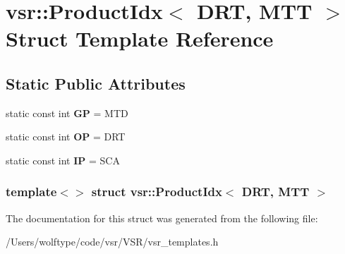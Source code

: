 \hypertarget{structvsr_1_1_product_idx_3_01_d_r_t_00_01_m_t_t_01_4}{\section{vsr\-:\-:Product\-Idx$<$ D\-R\-T, M\-T\-T $>$ Struct Template Reference}
\label{structvsr_1_1_product_idx_3_01_d_r_t_00_01_m_t_t_01_4}
}
\subsection*{Static Public Attributes}
\begin{DoxyCompactItemize}
\item 
\hypertarget{structvsr_1_1_product_idx_3_01_d_r_t_00_01_m_t_t_01_4_aff1a283d8f518d303e9a45dba33e93df}{static const int {\bfseries G\-P} = M\-T\-D}\label{structvsr_1_1_product_idx_3_01_d_r_t_00_01_m_t_t_01_4_aff1a283d8f518d303e9a45dba33e93df}

\item 
\hypertarget{structvsr_1_1_product_idx_3_01_d_r_t_00_01_m_t_t_01_4_a34f252b454ecdb130179be69dd9a7b7d}{static const int {\bfseries O\-P} = D\-R\-T}\label{structvsr_1_1_product_idx_3_01_d_r_t_00_01_m_t_t_01_4_a34f252b454ecdb130179be69dd9a7b7d}

\item 
\hypertarget{structvsr_1_1_product_idx_3_01_d_r_t_00_01_m_t_t_01_4_aa23e09c9fe1153a0dcf02bd1f08fdcf1}{static const int {\bfseries I\-P} = S\-C\-A}\label{structvsr_1_1_product_idx_3_01_d_r_t_00_01_m_t_t_01_4_aa23e09c9fe1153a0dcf02bd1f08fdcf1}

\end{DoxyCompactItemize}
\subsubsection*{template$<$$>$ struct vsr\-::\-Product\-Idx$<$ D\-R\-T, M\-T\-T $>$}



The documentation for this struct was generated from the following file\-:\begin{DoxyCompactItemize}
\item 
/\-Users/wolftype/code/vsr/\-V\-S\-R/vsr\-\_\-templates.\-h\end{DoxyCompactItemize}
